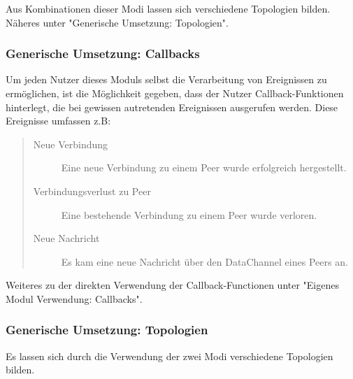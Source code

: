 Aus Kombinationen dieser Modi lassen sich verschiedene Topologien bilden. Näheres unter "Generische Umsetzung: Topologien".



\subsubsection{Generische Umsetzung: Callbacks}
Um jeden Nutzer dieses Moduls selbst die Verarbeitung von Ereignissen zu ermöglichen, ist die Möglichkeit gegeben, dass der Nutzer Callback-Funktionen hinterlegt, die bei gewissen autretenden Ereignissen ausgerufen werden.
Diese Ereignisse umfassen z.B:

\begin{quote}
  \begin{description}
  \item[Neue Verbindung]
  Eine neue Verbindung zu einem Peer wurde erfolgreich hergestellt.

  \item[Verbindungsverlust zu Peer]
  Eine bestehende Verbindung zu einem Peer wurde verloren.

  \item[Neue Nachricht]
  Es kam eine neue Nachricht über den DataChannel eines Peers an.
  \end{description}
\end{quote}

Weiteres zu der direkten Verwendung der Callback-Functionen unter "Eigenes Modul Verwendung: Callbacks".



\subsubsection{Generische Umsetzung: Topologien}
Es lassen sich durch die Verwendung der zwei Modi verschiedene Topologien bilden.


